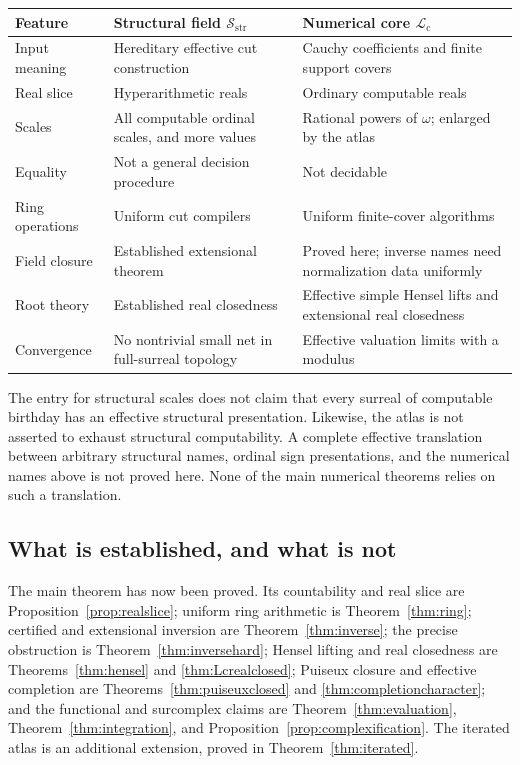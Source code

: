 \documentclass[11pt,letterpaper]{article}
\numberwithin{equation}{section}
\theoremstyle{definition}
\theoremstyle{remark}
\newcommand{\Sc}{\mathcal S_{\mathrm{str}}}
\newcommand{\Lc}{\mathcal L_{\mathrm c}}
\begin{document}
\begin{center}
\small
\begin{tabular}{@{}>{\raggedright\arraybackslash}p{}>{\raggedright\arraybackslash}p{}>{\raggedright\arraybackslash}p{}@{}}
\toprule
Feature & Structural field $\Sc$ & Numerical core $\Lc$ \\
\midrule
Input meaning & Hereditary effective cut construction & Cauchy coefficients and finite support covers \\
Real slice & Hyperarithmetic reals & Ordinary computable reals \\
Scales & All computable ordinal scales, and more values & Rational powers of $\omega$; enlarged by the atlas \\
Equality & Not a general decision procedure & Not decidable \\
Ring operations & Uniform cut compilers & Uniform finite-cover algorithms \\
Field closure & Established extensional theorem & Proved here; inverse names need normalization data uniformly \\
Root theory & Established real closedness & Effective simple Hensel lifts and extensional real closedness \\
Convergence & No nontrivial small net in full-surreal topology & Effective valuation limits with a modulus \\
\bottomrule
\end{tabular}
\end{center}

The entry for structural scales does not claim that every surreal of
computable birthday has an effective structural presentation. Likewise,
the atlas is not asserted to exhaust structural computability. A complete
effective translation between arbitrary structural names, ordinal sign
presentations, and the numerical names above is not proved here. None of
the main numerical theorems relies on such a translation.

\subsection{What is established, and what is not}

The main theorem has now been proved. Its countability and real slice are
Proposition~\ref{prop:realslice}; uniform ring arithmetic is
Theorem~\ref{thm:ring}; certified and extensional inversion are
Theorem~\ref{thm:inverse}; the precise obstruction is
Theorem~\ref{thm:inversehard}; Hensel lifting and real closedness are
Theorems~\ref{thm:hensel} and \ref{thm:Lcrealclosed}; Puiseux closure and
effective completion are Theorems~\ref{thm:puiseuxclosed} and
\ref{thm:completioncharacter}; and the functional and surcomplex claims
are Theorem~\ref{thm:evaluation}, Theorem~\ref{thm:integration}, and
Proposition~\ref{prop:complexification}. The iterated atlas is an additional
extension, proved in Theorem~\ref{thm:iterated}.
\end{document}
